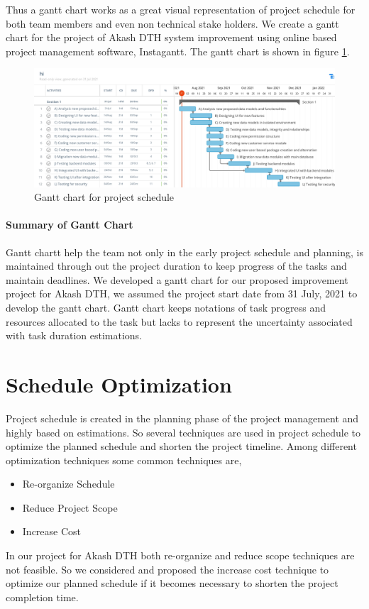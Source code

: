 \begin{spacing}{1}
Thus a gantt chart works as a great visual representation of project schedule for both team members and even non technical stake holders. We create a gantt chart for the project of Akash DTH system improvement using online based project management software, Instagantt. The gantt chart is shown in figure \ref{fig:gantt}.

\begin{figure}[H]
	\centering
	\includegraphics[width=\textwidth]{gantt}
	\caption{Gantt chart for project schedule}
	\label{fig:gantt}
\end{figure} 

\paragraph{Summary of Gantt Chart}
Gantt chartt help the team not only in the early project schedule and planning, is maintained through out the project duration to keep progress of the tasks and maintain deadlines. We developed a gantt chart for our proposed improvement project for Akash DTH, we assumed the project start date from 31 July, 2021 to develop the gantt chart. Gantt chart keeps notations of task progress and resources allocated to the task but lacks to represent the uncertainty associated with task duration estimations.  

\section{Schedule Optimization}
Project schedule is created in the planning phase of the project management and highly based on estimations. So several techniques are used in project schedule to optimize the planned schedule and shorten the project timeline. Among different optimization techniques some common techniques are,
\begin{itemize}
	\item Re-organize Schedule
	\item Reduce Project Scope
	\item Increase Cost
\end{itemize}
In our project for Akash DTH both re-organize and reduce scope techniques are not feasible. So we considered and proposed the increase cost technique to optimize our planned schedule if it becomes necessary to shorten the project completion time. 


\end{spacing}
